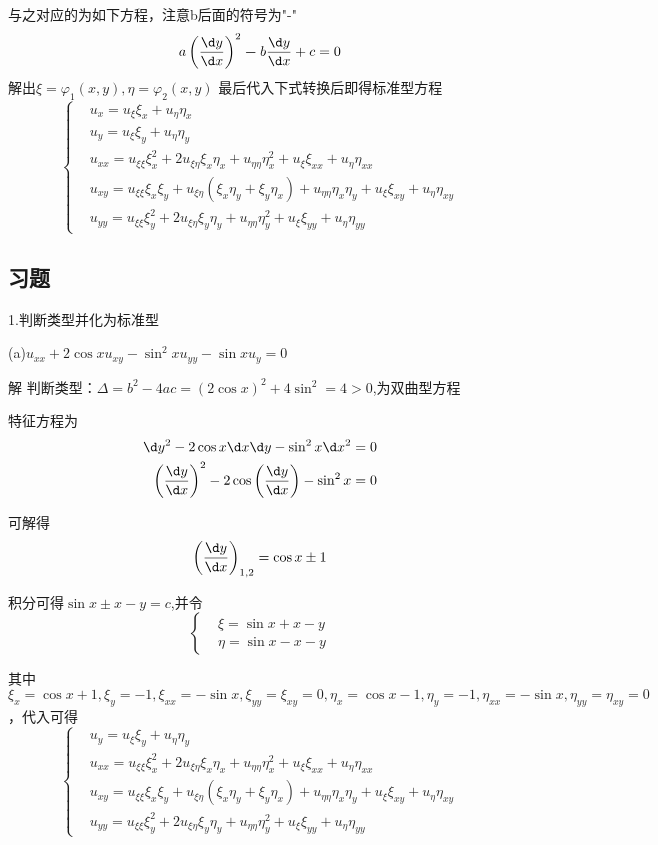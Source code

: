 \documentclass{article}
\begin{document}
与之对应的为如下方程，注意b后面的符号为"-"
$$
    a\left(\frac{\d y}{\d x}\right)^2\boldsymbol{-}b\frac{\d y}{\d x}+c =0
$$
解出$\xi = \varphi_1(x,y),\eta= \varphi_2(x,y)$
最后代入下式转换后即得标准型方程
$$
    \left\{
    \begin{aligned}
         & u_x = u_{\xi}\xi_x +u_{\eta}\eta_x  \\
         & u_y = u_{\xi}\xi_y +u_{\eta}\eta_y  \\
         & u_{xx} = u_{\xi\xi}\xi_x^2 +2u_{\xi\eta}\xi_x\eta_x+u_{\eta\eta}\eta_x^2+u_{\xi}\xi_{xx}+u_{\eta}\eta_{xx} \\
         & u_{xy} = u_{\xi\xi}\xi_x\xi_y+u_{\xi\eta}(\xi_x\eta_y+\xi_y\eta_x)+u_{\eta\eta}\eta_x\eta_y+u_{\xi}\xi_{xy}+u_{\eta}\eta_{xy} \\
         & u_{yy} = u_{\xi\xi}\xi_y^2+2u_{\xi\eta}\xi_y\eta_y+u_{\eta\eta}\eta_y^2+u_{\xi}\xi_{yy}+u_{\eta}\eta_{yy}
    \end{aligned}
    \right.
$$


\subsection{习题}
1.判断类型并化为标准型

(a)$u_{xx}+2\cos xu_{xy} - \sin^2 xu_{yy} -\sin xu_y=0$

解 \quad 判断类型：$\Delta = b^2-4ac=(2\cos x)^2+4\sin^2 =4>0$,为双曲型方程

特征方程为
\begin{align*}
    \d y^2-2\cos x \d x\d y - \sin^2 x \d x^2=0 \\
    \left(\frac{\d y}{\d x}\right)^2-2\cos \left(\frac{\d y}{\d x}\right)-\sin^2x=0
\end{align*}

可解得
$$
    \left(\frac{\d y}{\d x}\right)_{1,2}=\cos x \pm 1
$$

积分可得$\sin x \pm x - y=c$,并令
$$
    \left\{
    \begin{aligned}
         & \xi = \sin x +x-y  \\
         & \eta = \sin x -x-y
    \end{aligned}
    \right.
$$

其中
$\xi_x = \cos x+1,\xi_y=-1,\xi_{xx}=-\sin x,\xi_{yy}=\xi_{xy}=0,\eta_x=\cos x-1,\eta_y=-1,\eta_{xx}=-\sin x,\eta_{yy}=\eta_{xy}=0$，代入可得
$$
    \left\{
    \begin{aligned}
         & u_y = u_{\xi}\xi_y +u_{\eta}\eta_y \\
         & u_{xx} = u_{\xi\xi}\xi_x^2 +2u_{\xi\eta}\xi_x\eta_x+u_{\eta\eta}\eta_x^2+u_{\xi}\xi_{xx}+u_{\eta}\eta_{xx} \\
         & u_{xy} = u_{\xi\xi}\xi_x\xi_y+u_{\xi\eta}(\xi_x\eta_y+\xi_y\eta_x)+u_{\eta\eta}\eta_x\eta_y+u_{\xi}\xi_{xy}+u_{\eta}\eta_{xy} \\
         & u_{yy} = u_{\xi\xi}\xi_y^2+2u_{\xi\eta}\xi_y\eta_y+u_{\eta\eta}\eta_y^2+u_{\xi}\xi_{yy}+u_{\eta}\eta_{yy}
    \end{aligned}
    \right.
$$
\end{document}
